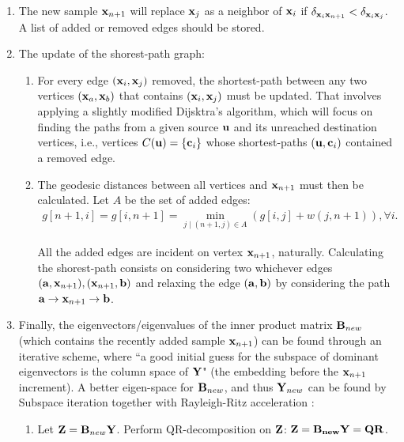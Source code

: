 \begin{enumerate}
	\item The new sample $\mathbf{x}_{n+1}$ will replace $\mathbf{x}_j$ as a neighbor of $\mathbf{x}_i$ if $\delta_{\mathbf{x}_i \mathbf{x}_{n+1}} < \delta_{\mathbf{x}_i \mathbf{x}_j}$. A list of added or removed edges should be stored.
	
	\item The update of the shorest-path graph:
	\begin{enumerate}
		\item For every edge $(\mathbf{x}_i, \mathbf{x}_j)$ removed, the shortest-path between any two vertices $(\mathbf{x}_a, \mathbf{x}_b)$ that contains $(\mathbf{x}_i, \mathbf{x}_j)$ must be updated. That involves applying a slightly modified Dijsktra's algorithm, which will focus on finding the paths from a given source $\mathbf{u}$ and its unreached destination vertices, i.e., vertices $C(\mathbf{u})=\{\mathbf{c}_i\}$ whose  shortest-paths $(\mathbf{u}, \mathbf{c}_i)$ contained a removed edge.
		
		\item The geodesic distances between all vertices and $\mathbf{x}_{n+1}$ must then be calculated. Let $A$ be the set of added edges:
		\begin{align*}
			g[n+1, i] = g[i, n+1] = \min_{j \mid (n+1, j) \in A} (g[i, j]+w(j, n+1)),\forall i.
		\end{align*}
		
		All the added edges are incident on vertex $\mathbf{x}_{n+1}$, naturally.  Calculating the shorest-path consists on considering two whichever edges $(\mathbf{a}, \mathbf{x}_{n+1}), (\mathbf{x}_{n+1}, \mathbf{b})$ and relaxing the edge $(\mathbf{a}, \mathbf{b})$ by considering the path $\mathbf{a} \to \mathbf{x}_{n+1} \to \mathbf{b}$.
	\end{enumerate}
	
	\item Finally, the eigenvectors/eigenvalues of the inner product matrix $\mathbf{B}_{new}$ (which contains the recently added sample $\mathbf{x}_{n+1}$) can be found through an iterative scheme, where ``a good initial guess for the subspace of dominant eigenvectors is the column space of $\mathbf{Y}$" \cite{law2006incremental} (the embedding before the $\mathbf{x}_{n+1}$ increment).
	A better eigen-space for $\mathbf{B}_{new}$, and thus $\mathbf{Y}_{new}$ can be found by Subspace iteration together with Rayleigh-Ritz acceleration \cite{law2006incremental}:
	\begin{enumerate}
		\item Let $\mathbf{Z} = \mathbf{B}_{new} \mathbf{Y}$. Perform QR-decomposition on $\mathbf{Z}$: $\mathbf{Z = B_{new}Y = QR}$.
		

\end{enumerate}
\end{enumerate}
